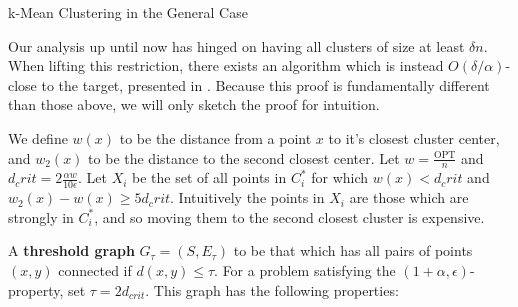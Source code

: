 \documentclass[paper=a4, fontsize=10.5pt]{scrartcl} %
\makeatletter
\numberwithin{equation}{section} %
\numberwithin{figure}{section} %
\numberwithin{table}{section} %
\def\BState{\State\hskip-\ALG@thistlm}
\makeatother
\begin{document}
\begin{algorithm}
\caption{k-Mean Clustering in the General Case}\label{alg:cluster2}
\end{algorithm}

Our analysis up until now has hinged on having all clusters of size at least $\delta n$. When lifting this restriction, there exists an algorithm which is instead $O(\delta/\alpha)$-close to the target, presented in \cite{firstpaper}. Because this proof is fundamentally different than those above, we will only sketch the proof for intuition. 

We define $w(x)$ to be the distance from a point $x$ to it's closest cluster center, and $w_2(x)$ to be the distance to the second closest center. Let $w = \frac{\text{OPT}}{n}$ and $d_crit = 2\frac{\alpha w}{10 \epsilon}$. Let $X_i$ be the set of all points in $C_i^*$ for which $w(x) < d_crit$ and $w_2(x) - w(x) \geq 5d_crit$. Intuitively the points in $X_i$ are those which are strongly in $C_i^*$, and so moving them to the second closest cluster is expensive.

A \textbf{threshold graph} $G_\tau = (S, E_\tau)$ to be that which has all pairs of points $(x, y)$ connected if $d(x, y) \leq \tau$. For a problem satisfying the $(1 + \alpha, \epsilon)$-property, set $\tau = 2d_{crit}$. This graph has the following properties:
\end{document}
